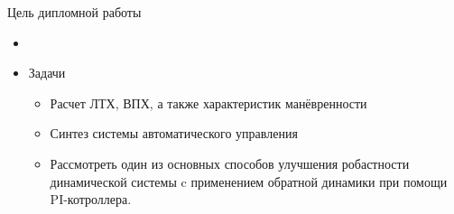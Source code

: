 \begin{frame}{Цель дипломной работы}
\begin{itemize}
    \item <+-> []
    \item <+-> [] \begin{block}{Задачи}
        \begin{itemize}
        \item Расчет ЛТХ, ВПХ, а также характеристик манёвренности
        \item Синтез системы автоматического управления
        \item Рассмотреть один из основных способов улучшения робастности динамической 
        системы c применением обратной динамики при помощи PI-котроллера.
        \end{itemize}
    \end{block}
\end{itemize}    
\end{frame}
